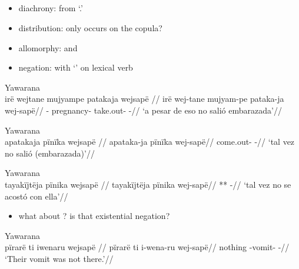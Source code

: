 \documentclass{memoir}
\begin{document}
\subsection{\texorpdfstring{}{}}

\begin{itemize}
\tightlist
\item
  diachrony: from  `.'
\item
  distribution: only occurs on the copula?
\item
  allomorphy:  and 
\item
  negation: with  `' on lexical verb
   
\end{itemize}

\ex Yawarana \\
\label{ctoaragrme-38}    \begingl
    \glpreamble irë wejtane mujyampe patakaja wejsapë //
    \gla irë wej-tane mujyam-pe pataka-ja wej-sapë//
    \glb {} - pregnancy- take.out- -//
        \glft ‘a pesar de eso no salió embarazada’//  
    \endgl 
\xe

\ex Yawarana \\
\label{ctoaragrme-39}    \begingl
    \glpreamble apatakaja pïnïka wejsapë //
    \gla apataka-ja pïnïka wej-sapë//
    \glb come.out-  -//
        \glft ‘tal vez no salió (embarazada)’//  
    \endgl 
\xe

\ex Yawarana \\
\label{ctoaragrme-40}    \begingl
    \glpreamble tayakïjtëja pïnika wejsapë //
    \gla tayakïjtëja pïnika wej-sapë//
    \glb ***  -//
        \glft ‘tal vez no se acostó con ella’//  
    \endgl 
\xe

\begin{itemize}
\tightlist
\item
  what about ? is that existential negation?
\end{itemize}

\ex Yawarana \\
\label{ctorat-19}    \begingl
    \glpreamble pïrarë ti iwenaru wejsapë //
    \gla pïrarë ti i-wena-ru wej-sapë//
    \glb nothing  -vomit- -//
        \glft ‘Their vomit was not there.’//  
    \endgl 
\xe

\subsection{\texorpdfstring{ \label{sec:sareimn}}{ }}
\end{document}
